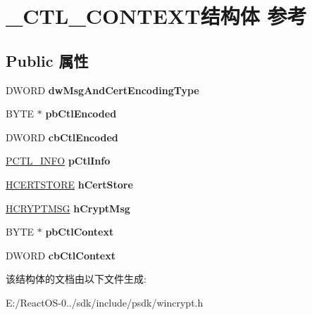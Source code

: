 \hypertarget{struct___c_t_l___c_o_n_t_e_x_t}{}\section{\+\_\+\+C\+T\+L\+\_\+\+C\+O\+N\+T\+E\+X\+T结构体 参考}
\label{struct___c_t_l___c_o_n_t_e_x_t}
\subsection*{Public 属性}
\begin{DoxyCompactItemize}
\item 
\mbox{\label{struct___c_t_l___c_o_n_t_e_x_t_a8a5aff1aad72d6729a4ab8fbc9cf75f7}} 
D\+W\+O\+RD {\bfseries dw\+Msg\+And\+Cert\+Encoding\+Type}
\item 
\mbox{\label{struct___c_t_l___c_o_n_t_e_x_t_a2d9e272f4d8572e6d289c79e05422c55}} 
B\+Y\+TE $\ast$ {\bfseries pb\+Ctl\+Encoded}
\item 
\mbox{\label{struct___c_t_l___c_o_n_t_e_x_t_a0e5e081750b34901302c0e90e70ad7c9}} 
D\+W\+O\+RD {\bfseries cb\+Ctl\+Encoded}
\item 
\mbox{\label{struct___c_t_l___c_o_n_t_e_x_t_ad49ec681ff0db08efbeab43c83628e51}} 
\hyperlink{struct___c_t_l___i_n_f_o}{P\+C\+T\+L\+\_\+\+I\+N\+FO} {\bfseries p\+Ctl\+Info}
\item 
\mbox{\label{struct___c_t_l___c_o_n_t_e_x_t_a8c70f293e006ba61f3320a00e29338db}} 
\hyperlink{interfacevoid}{H\+C\+E\+R\+T\+S\+T\+O\+RE} {\bfseries h\+Cert\+Store}
\item 
\mbox{\label{struct___c_t_l___c_o_n_t_e_x_t_a49552d4a6c9e355704cf40ee30fab786}} 
\hyperlink{interfacevoid}{H\+C\+R\+Y\+P\+T\+M\+SG} {\bfseries h\+Crypt\+Msg}
\item 
\mbox{\label{struct___c_t_l___c_o_n_t_e_x_t_aeb1a688b7b54f30fb0e6a82bbc310e60}} 
B\+Y\+TE $\ast$ {\bfseries pb\+Ctl\+Context}
\item 
\mbox{\label{struct___c_t_l___c_o_n_t_e_x_t_aec78168d9cc97409ea825a2c34649a0e}} 
D\+W\+O\+RD {\bfseries cb\+Ctl\+Context}
\end{DoxyCompactItemize}


该结构体的文档由以下文件生成\+:\begin{DoxyCompactItemize}
\item 
E\+:/\+React\+O\+S-\/0../sdk/include/psdk/wincrypt.\+h\end{DoxyCompactItemize}
